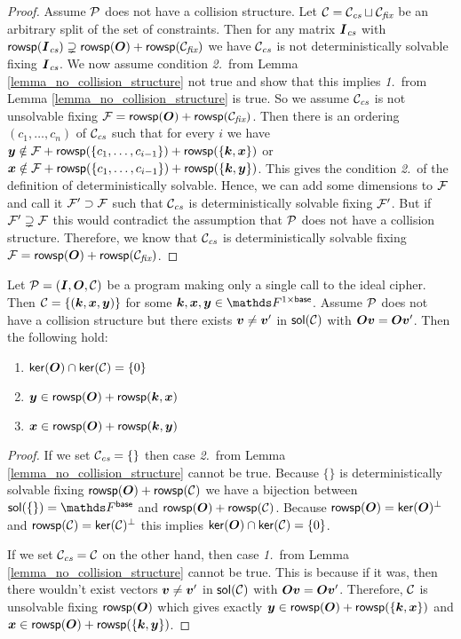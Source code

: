 \begin{proof}
    Assume $\P$ does not have a collision structure.
    Let $\C = \Ccs \sqcup \Cfix$ be an arbitrary split of the set of constraints.
    Then for any matrix $\Ics$ with $\rowsp(\Ics) \supsetneq \rowsp(\O) + \rowsp(\Cfix)$ we have
    $\Ccs$ is not deterministically solvable fixing $\Ics$.
    We now assume condition \textit{2.}~from Lemma \ref{lemma_no_collision_structure} not true
    and show that this implies \textit{1.}~from Lemma \ref{lemma_no_collision_structure} is true.
    So we assume $\Ccs$ is not unsolvable fixing $\Fix = \rowsp(\O) + \rowsp(\Cfix)$.
    Then there is an ordering $(c_1, \dots, c_n)$ of $\Ccs$ such that for every $i$ we have
    $\vy \notin \Fix + \rowsp(\{\dts c {i-1}\}) + \rowsp(\{ \vk, \vx \})$ or
    $\vx \notin \Fix + \rowsp(\{\dts c {i-1}\}) + \rowsp(\{ \vk, \vy \})$.
    This gives the condition \textit{2.}~of the definition of deterministically solvable.
    Hence, we can add some dimensions to $\Fix$ and call it $\Fix' \supset \Fix$ such that
    $\Ccs$ is deterministically solvable fixing $\Fix'$.
    But if $\Fix' \supsetneq \Fix$ this would contradict the assumption that $\P$ does not have a collision structure.
    Therefore, we know that $\Ccs$ is deterministically solvable fixing $\Fix = \rowsp(\O) + \rowsp(\Cfix)$.
\end{proof}

\begin{corollary}
\label{single_query_properties}
    Let $\P = (\I, \O, \C)$ be a program making only a single call to the ideal cipher.
    Then $\C = \{ (\vk, \vx, \vy)\}$ for some $\vk, \vx, \vy \in \Frowsp$.
    Assume $\P$ does not have a collision structure but there exists $\vv \neq \vv'$ in $\sol(\C)$ with $\O\vv = \O\vv'$.
    Then the following hold:
    \begin{enumerate}
    \item $\ker(\O) \cap \ker(\C) = \{0\}$
    \item $\vy \in \rowsp(\O) + \rowsp(\vk, \vx)$
    \item $\vx \in \rowsp(\O) + \rowsp(\vk, \vy)$
    \end{enumerate}
\end{corollary}
\begin{proof}
    If we set $\Ccs = \{\}$ then case \textit{2.}~from Lemma \ref{lemma_no_collision_structure} cannot be true.
    Because $\{\}$ is deterministically solvable fixing $\rowsp(\O) + \rowsp(\C)$ we have a bijection between
    $\sol(\{\}) = \Fsp$ and $\rowsp(\O) + \rowsp(\C)$.
    Because $\rowsp(\O) = \ker(\O)^\perp$ and $\rowsp(\C) = \ker(\C)^\perp$
    this implies $\ker(\O) \cap \ker(\C) = \{0\}$.
    
    If we set $\Ccs = \C$ on the other hand,
    then case \textit{1.}~from Lemma \ref{lemma_no_collision_structure} cannot be true.
    This is because if it was, then there wouldn't exist vectors $\vv \neq \vv'$ in $\sol(\C)$ with $\O\vv = \O\vv'$.
    Therefore, $\C$ is unsolvable fixing $\rowsp(\O)$ which gives exactly 
    $\vy \in \rowsp(\O) + \rowsp(\{\vk, \vx\})$ and
    $\vx \in \rowsp(\O) + \rowsp(\{\vk, \vy\})$.
\end{proof}

